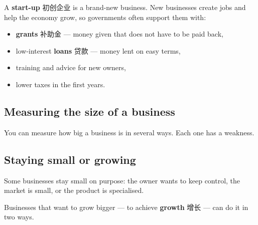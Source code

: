 \documentclass[11pt]{article}
\begin{document}
A \textbf{start-up} 初创企业 is a brand-new business. New businesses create jobs and help the economy grow, so governments often support them with:

\begin{itemize}
\item \textbf{grants} 补助金 — money given that does not have to be paid back,

\item low-interest \textbf{loans} 贷款 — money lent on easy terms,

\item training and advice for new owners,

\item lower taxes in the first years.

\end{itemize}

\subsection*{Measuring the size of a business}

You can measure how big a business is in several ways. Each one has a weakness.

\begin{center}
\end{center}

\subsection*{Staying small or growing}

Some businesses stay small on purpose: the owner wants to keep control, the market is small, or the product is specialised.

Businesses that want to grow bigger — to achieve \textbf{growth} 增长 — can do it in two ways.
\end{document}

